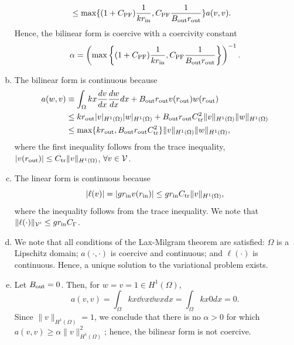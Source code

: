 \documentclass[preprint,11pt]{article}
\begin{document}
\begin{enumerate}[(a)]
\begin{align*}
 &\leq
         \max\{   (1 + C_{\rm PF}) \frac{1}{k r_{\rm in}}, C_{\rm PF} \frac{1}{B_{\rm out} r_{\rm out}} \} a(v,v).
  \end{align*}
  Hence, the bilinear form is coercive with a coercivity constant
  \begin{equation*}
    \alpha = \left( \max\left\{   (1 + C_{\rm PF}) \frac{1}{k r_{\rm in}}, C_{\rm PF} \frac{1}{B_{\rm out} r_{\rm out}} \right\} \right)^{-1}.
  \end{equation*}
\item The bilinear form is continuous because
  \begin{align*}
    a(w,v) &\equiv \int_{\Omega} kx \frac{d v}{d x} \frac{d w}{d x} dx + B_{\rm out} r_{\rm out} v(r_{\rm out}) w(r_{\rm out})
    \\
    &\leq
    k r_{\rm out} | v |_{H^1(\Omega)} | w |_{H^1(\Omega)} + B_{\rm out} r_{\rm out} C_{\rm tr}^2 \| v \|_{H^1(\Omega)} \| w \|_{H^1(\Omega)}
    \\
    &\leq
    \max\{ k r_{\rm out}, B_{\rm out} r_{\rm out} C_{\rm tr}^2 \}  \| v \|_{H^1(\Omega)}\| w \|_{H^1(\Omega)},
  \end{align*}
  where the first inequality follows from the trace inequality, $|v(r_{\rm out})| \leq C_{\rm tr}\|v\|_{H^1(\Omega)}$, $\forall v \in \mathcal{V}$.
\item The linear form is continuous because
  \begin{equation*}
    | \ell(v) | = |gr_{\rm in} v(r_{\rm in})| \leq gr_{\rm in} C_{\rm tr} \|v\|_{H^1(\Omega)}, 
  \end{equation*}
  where the inequality follows from the trace inequality.  We note that $\| \ell(\cdot) \|_{\mathcal{V}'} \leq  gr_{\rm in} C_{\Gamma}$.
\item We note that all conditions of the Lax-Milgram theorem are satisfied: $\Omega$ is a Lipschitz domain; $a(\cdot,\cdot)$ is coercive and continuous; and $\ell(\cdot)$ is continuous.  Hence, a unique solution to the variational problem exists.
\item Let $B_{\rm out} = 0$.  Then, for $w = v = 1 \in H^1(\Omega)$,
  \begin{equation*}
    a(v,v) = \int_{\Omega} k x \dd{v}{x} \dd{w}{x} dx = \int_{\Omega} k x 0 dx = 0.
  \end{equation*}
  Since $\| v \|_{H^1(\Omega)} = 1$, we conclude that there is no $\alpha > 0$ for which $a(v,v) \geq \alpha \| v \|_{H^1(\Omega)}^2$; hence, the bilinear form is not coercive.


\end{enumerate}
\end{document}
